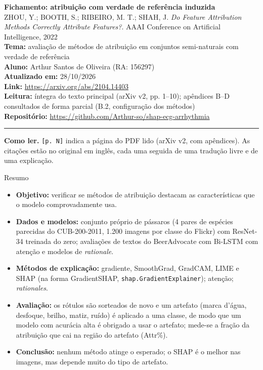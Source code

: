 \documentclass[11pt,a4paper]{article}
\begin{document}
\begin{center}
    {\LARGE \textbf{Fichamento: atribuição com verdade de referência induzida}} \\[0.35em]
    {\large ZHOU, Y.; BOOTH, S.; RIBEIRO, M. T.; SHAH, J. \textit{Do Feature Attribution Methods Correctly Attribute Features?}. AAAI Conference on Artificial Intelligence, 2022} \\[0.3em]
    \textbf{Tema:} avaliação de métodos de atribuição em conjuntos semi-naturais com verdade de referência \\[0.2em]
    \textbf{Aluno:} Arthur Santos de Oliveira (RA: 156297) \\[0.2em]
    \textbf{Atualizado em:} 28/10/2026 \\[0.2em]
    \textbf{Link:} \url{https://arxiv.org/abs/2104.14403} \\[0.2em]
    \textbf{Leitura:} íntegra do texto principal (arXiv v2, pp. 1--10); apêndices B--D consultados de forma parcial (B.2, configuração dos métodos) \\[0.2em]
    \textbf{Repositório:} \url{https://github.com/Arthur-so/shap-ecg-arrhythmia}
\end{center}
\vspace{-0.5em}
\hrule
\vspace{0.8em}

\textbf{Como ler.} \texttt{[p. N]} indica a página do PDF lido (arXiv v2, com apêndices). As citações estão no original em inglês, cada uma seguida de uma tradução livre e de uma explicação.

\begin{infobox}[note]{Resumo}
\begin{itemize}
  \item \textbf{Objetivo:} verificar se métodos de atribuição destacam as características que o modelo comprovadamente usa.
  \item \textbf{Dados e modelos:} conjunto próprio de pássaros (4 pares de espécies parecidas do CUB-200-2011, 1.200 imagens por classe do Flickr) com ResNet-34 treinada do zero; avaliações de textos do BeerAdvocate com Bi-LSTM com atenção e modelos de \textit{rationale}.
  \item \textbf{Métodos de explicação:} gradiente, SmoothGrad, GradCAM, LIME e SHAP (na forma GradientSHAP, \texttt{shap.GradientExplainer}); atenção; \textit{rationales}.
  \item \textbf{Avaliação:} os rótulos são sorteados de novo e um artefato (marca d'água, desfoque, brilho, matiz, ruído) é aplicado a uma classe, de modo que um modelo com acurácia alta é obrigado a usar o artefato; mede-se a fração da atribuição que cai na região do artefato (Attr\%).
  \item \textbf{Conclusão:} nenhum método atinge o esperado; o SHAP é o melhor nas imagens, mas depende muito do tipo de artefato.
\end{itemize}
\end{infobox}
\end{document}
